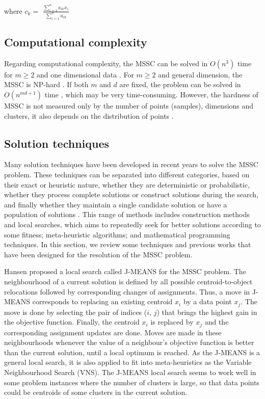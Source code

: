 \begin{center}
where $c_k = $ \Large $\frac{\sum_{i = 1}^{n}a_{ik}x_i}{\sum_{i = 1}^{n}a_{ik}}$	
\end{center}
	
\subsection{Computational complexity}
Regarding computational complexity, the MSSC can be solved in $O(n^3)$ time for $m \geq 2$ and one dimensional data \cite{Spath1980}. For $m \geq 2$ and general dimension, the MSSC is NP-hard \cite{Aloise2009}. If both $m$ and $d$ are fixed, the problem can be solved in $O(n^{md+1})$ time \cite{Inaba1994}, which may be very time-consuming. However, the hardness of MSSC is not measured only by the number of points (samples), dimensions and clusters, it also depends on the distribution of points \cite{Aloise2009Branch}.


\subsection{Solution techniques}
Many solution techniques have been developed in recent years to solve the MSSC problem. These techniques can be separated into different categories, based on their exact or heuristic nature, whether they are deterministic or probabilistic, whether they process complete solutions or construct solutions during the search, and finally whether they maintain a single candidate solution or have a population of solutions \cite{Das2009}. This range of methods includes construction methods and local searches, which aims to repeatedly seek for better solutions according to some fitness; meta-heuristic algorithms; and mathematical programming techniques. In this section, we review some techniques and previous works that have been designed for the resolution of the MSSC problem.

Hansen \cite{Hansen2001} proposed a local search called J-MEANS for the MSSC problem. The neighbourhood of a current solution is defined by all possible centroid-to-object relocations followed by corresponding changes of assignments. Thus, a move in J-MEANS corresponds to replacing an existing centroid $x_i$ by a data point $x_j$. The move is done by selecting the pair of indices ($i$, $j$) that brings the highest gain in the objective function. Finally, the centroid $x_i$ is replaced by $x_j$ and the corresponding assignment updates are done. Moves are made in these neighbourhoods whenever the value of a neighbour's objective function is better than the current solution, until a local optimum is reached. As the J-MEANS is a general local search, it is also applied to fit into meta-heuristics as the Variable Neighbourhood Search (VNS). The J-MEANS local search seems to work well in some problem instances where the number of clusters is large, so that data points could be centroids of some clusters in the current solution.

